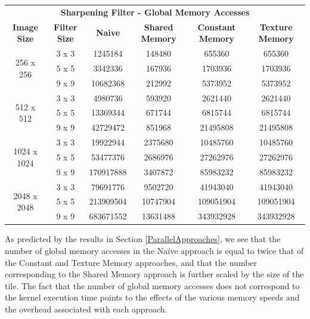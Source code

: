 \documentclass[10pt]{article}
\begin{document}
\begin{table}[H]
\small
\begin{tabular}{cccccc}
\multicolumn{6}{c}{\textbf{Sharpening Filter - Global Memory Accesses}}                                                                            \\
\textbf{Image Size}          & \textbf{Filter Size} & \textbf{Naive} & \textbf{Shared Memory} & \textbf{Constant Memory} & \textbf{Texture Memory} \\ \hline
\multirow{3}{*}{256 x 256}   & 3 x 3                & 1245184        & 148480                 & 655360                   & 655360                  \\
                             & 5 x 5                & 3342336        & 167936                 & 1703936                  & 1703936                 \\
                             & 9 x 9                & 10682368       & 212992                 & 5373952                  & 5373952                 \\ \hline
\multirow{3}{*}{512 x 512}   & 3 x 3                & 4980736        & 593920                 & 2621440                  & 2621440                 \\
                             & 5 x 5                & 13369344       & 671744                 & 6815744                  & 6815744                 \\
                             & 9 x 9                & 42729472       & 851968                 & 21495808                 & 21495808                \\ \hline
\multirow{3}{*}{1024 x 1024} & 3 x 3                & 19922944       & 2375680                & 10485760                 & 10485760                \\
                             & 5 x 5                & 53477376       & 2686976                & 27262976                 & 27262976                \\
                             & 9 x 9                & 170917888      & 3407872                & 85983232                 & 85983232                \\ \hline
\multirow{3}{*}{2048 x 2048} & 3 x 3                & 79691776       & 9502720                & 41943040                 & 41943040                \\
                             & 5 x 5                & 213909504      & 10747904               & 109051904                & 109051904               \\
                             & 9 x 9                & 683671552      & 13631488               & 343932928                & 343932928              
\end{tabular}
\end{table}
As predicted by the results in Section \ref{ParallelApproaches}, we see that the number of global memory accesses in the Na\"{i}ve approach is equal to twice that of the Constant and Texture Memory approaches, and that the number corresponding to the Shared Memory approach is further scaled by the size of the tile. The fact that the number of global memory accesses does not correspond to the kernel execution time points to the effects of the various memory speeds and the overhead associated with each approach.
\end{document}

